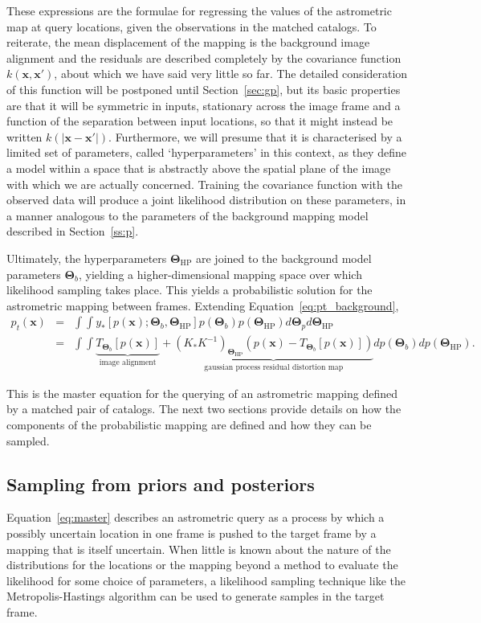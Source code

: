 \documentclass[manuscript]{aastex}
\newcommand{\bsT}{\boldsymbol\Theta}
\begin{document}
These expressions are the formulae for regressing the values of the astrometric map at query locations, given the observations in the matched catalogs. To reiterate, the mean displacement of the mapping is the background image alignment and the residuals are described completely by the covariance function $k(\mathbf{x},\mathbf{x}')$, about which we have said very little so far. The detailed consideration of this function will be postponed until Section~\ref{sec:gp}, but its basic properties are that it will be symmetric in inputs, stationary across the image frame and a function of the separation between input locations, so that it might instead be written $k(|\mathbf{x}-\mathbf{x}'|)$. Furthermore, we will presume that it is characterised by a limited set of parameters, called `hyperparameters' in this context, as they define a model within a space that is abstractly above the spatial plane of the image with which we are actually concerned. Training the covariance function with the observed data will produce a joint likelihood distribution on these parameters, in a manner analogous to the parameters of the background mapping model described in Section~\ref{ss:p}.

Ultimately, the hyperparameters $\bsT_\mathrm{HP}$ are joined to the background model parameters $\bsT_b$, yielding a higher-dimensional mapping space over which likelihood sampling takes place. This yields a probabilistic solution for the astrometric mapping between frames. Extending Equation~\eqref{eq:pt_background},
\begin{eqnarray}
 p_t(\mathbf{x}) & = & \int \int y_\ast\left[p(\mathbf{x}); \bsT_b, \bsT_\mathrm{HP}\right] p(\bsT_b) p(\bsT_\mathrm{HP}) d\bsT_p d\bsT_\mathrm{HP}  \\
 & = & \int \int \underbrace{T_{\bsT_b}\left[p(\mathbf{x})\right]}_\textrm{image alignment}+ \underbrace{\left(K_\ast K^{-1}\right)_{\bsT_\mathrm{HP}}\left(p(\mathbf{x}) - T_{\bsT_b}\left[p(\mathbf{x})\right]\right)}_\textrm{gaussian process residual distortion map} dp(\bsT_b) dp(\bsT_\mathrm{HP}).\label{eq:master}
 \end{eqnarray}

This is the master equation for the querying of an astrometric mapping defined by a matched pair of catalogs. The next two sections provide details on how the components of the probabilistic mapping are defined and how they can be sampled.

\subsection{Sampling from priors and posteriors}
Equation~\eqref{eq:master} describes an astrometric query as a process by which a possibly uncertain location in one frame is pushed to the target frame by a mapping that is itself uncertain. When little is known about the nature of the distributions for the locations or the mapping beyond a method to evaluate the likelihood for some choice of parameters, a likelihood sampling technique like the Metropolis-Hastings algorithm can be used to generate samples in the target frame.
\end{document}
